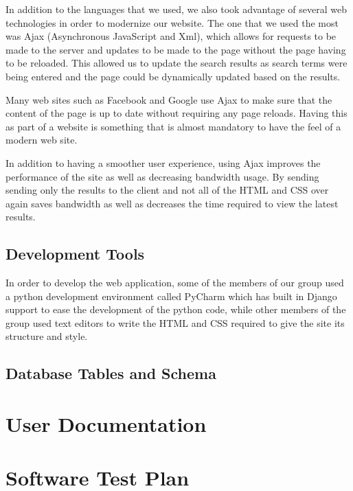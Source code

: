 \documentclass[11pt]{article}
\begin{document}
In addition to the languages that we used, we also took advantage of
several web technologies in order to modernize our website. The one
that we used the most was Ajax (Asynchronous JavaScript and Xml),
which allows for requests to be made to the server and updates to be
made to the page without the page having to be reloaded. This allowed
us to update the search results as search terms were being entered and
the page could be dynamically updated based on the results.

Many web sites such as Facebook and Google use Ajax to make sure that
the content of the page is up to date without requiring any page
reloads. Having this as part of a website is something that is almost
mandatory to have the feel of a modern web site.

In addition to having a smoother user experience, using Ajax improves
the performance of the site as well as decreasing bandwidth usage. By
sending sending only the results to the client and not all of the HTML
and CSS over again saves bandwidth as well as decreases the time
required to view the latest results. 

\subsection{Development Tools}
\label{sec-development-tools}

In order to develop the web application, some of the members of our
group used a python development environment called PyCharm which has
built in Django support to ease the development of the python
code, while other members of the group used text editors to write the
HTML and CSS required to give the site its structure and style.


\subsection{Database Tables and Schema}
\label{sec-database-schema}

\section{User Documentation}
\label{sec-user-docs}

\section{Software Test Plan}
\label{sec-software-test-plan}
\end{document}
